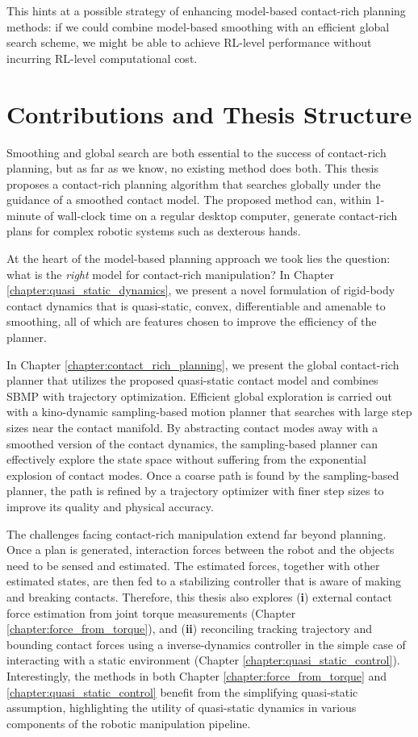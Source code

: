 This hints at a possible strategy of enhancing model-based contact-rich planning methods: if we could combine model-based smoothing with an efficient global search scheme, we might be able to achieve RL-level performance without incurring RL-level computational cost.


\section{Contributions and Thesis Structure}
Smoothing and global search are both essential to the success of contact-rich planning, but as far as we know, no existing method does both. This thesis proposes a contact-rich planning algorithm that searches globally under the guidance of a smoothed contact model. The proposed method can, within 1-minute of wall-clock time on a regular desktop computer, generate contact-rich plans for complex robotic systems such as dexterous hands.

At the heart of the model-based planning approach we took lies the question: what is the \emph{right} model for contact-rich manipulation? In Chapter \ref{chapter:quasi_static_dynamics}, we present a novel formulation of rigid-body contact dynamics that is quasi-static, convex, differentiable and amenable to smoothing, all of which are features chosen to improve the efficiency of the planner.

In Chapter \ref{chapter:contact_rich_planning}, we present the global contact-rich planner that utilizes the proposed quasi-static contact model and combines SBMP with trajectory optimization. Efficient global exploration is carried out with a kino-dynamic sampling-based motion planner that searches with large step sizes near the contact manifold. By abstracting contact modes away with a smoothed version of the contact dynamics, the sampling-based planner can effectively explore the state space without suffering from the exponential explosion of contact modes. Once a coarse path is found by the sampling-based planner, the path is refined by a trajectory optimizer with finer step sizes to improve its quality and physical accuracy. 

The challenges facing contact-rich manipulation extend far beyond planning. Once a plan is generated, interaction forces between the robot and the objects need to be sensed and estimated. The estimated forces, together with other estimated states, are then fed to a stabilizing controller that is aware of making and breaking contacts. 
Therefore, this thesis also explores (\textbf{i}) external contact force estimation from joint torque measurements (Chapter \ref{chapter:force_from_torque}), and (\textbf{ii}) reconciling tracking trajectory and bounding contact forces using a inverse-dynamics controller in the simple case of interacting with a static environment (Chapter \ref{chapter:quasi_static_control}). Interestingly, the methods in both Chapter \ref{chapter:force_from_torque} and \ref{chapter:quasi_static_control} benefit from the simplifying quasi-static assumption, highlighting the utility of quasi-static dynamics in various components of the robotic manipulation pipeline. 




